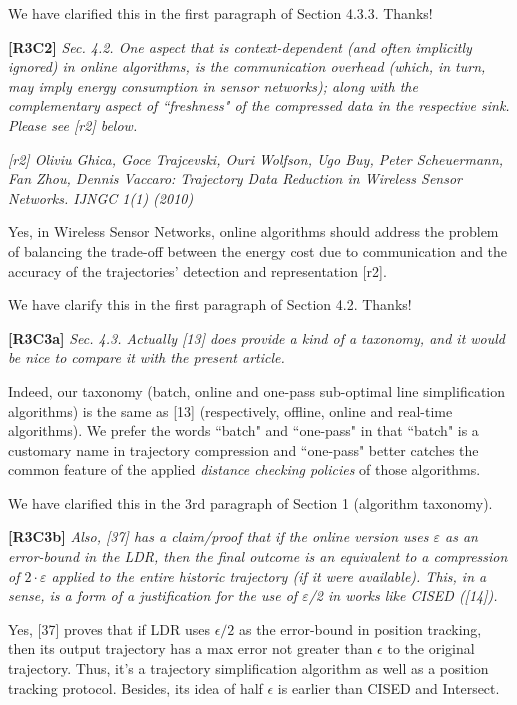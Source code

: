 \documentclass{letter}
\begin{document}
We have clarified this in the first paragraph of Section 4.3.3. Thanks!

\textbf{[R3C2]} \emph{
Sec. 4.2. One aspect that is context-dependent (and often implicitly ignored) in online algorithms, is the communication overhead (which, in turn, may imply energy consumption in sensor networks); along with the complementary aspect of ``freshness" of the compressed data in the respective sink. Please see [r2] below.}

\emph{[r2] Oliviu Ghica, Goce Trajcevski, Ouri Wolfson, Ugo Buy, Peter Scheuermann, Fan Zhou, Dennis Vaccaro: Trajectory Data Reduction in Wireless Sensor Networks. IJNGC 1(1) (2010)
}

{Yes, in Wireless Sensor Networks, online algorithms should address the problem of balancing the trade-off between the energy cost due to communication and the accuracy of the trajectories’ detection and representation [r2].}

We have clarify this in the first paragraph of Section 4.2. 
Thanks!

\textbf{[R3C3a]} \emph{
Sec. 4.3. Actually [13] does provide a kind of a taxonomy, and it would be nice to compare it with the present article. }

Indeed, our taxonomy (batch, online and one-pass sub-optimal line simplification algorithms) is the same as [13] (respectively, offline, online and real-time algorithms). 
We prefer the words ``batch" and ``one-pass" in that ``batch" is a customary name in trajectory compression and ``one-pass" better catches the common feature of the applied \emph{distance checking policies} of those algorithms.  

We have clarified this in the 3rd paragraph of Section 1 (algorithm taxonomy). 

\textbf{[R3C3b]} \emph{Also, [37] has a claim/proof that if the online version uses $\varepsilon$ as an error-bound in the LDR, then the final outcome is an equivalent to a compression of $2 \cdot \varepsilon$ applied to the entire historic trajectory (if it were available). This, in a sense, is a form of a justification for the use of $\varepsilon$/2 in works like CISED ([14]).}

{Yes, [37] proves that if LDR uses $\epsilon/2$ as the error-bound in position tracking, then its output trajectory has a max error not greater than $\epsilon$ to the original trajectory. Thus, it's a trajectory simplification algorithm as well as a position tracking protocol.} Besides, its idea of half $\epsilon$ is earlier than CISED and Intersect.
\end{document}
